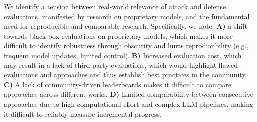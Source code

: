 




We identify a tension between real-world relevance of attack and defense evaluations, manifested by research on proprietary models, and the fundamental need for reproducible and comparable research. Specifically, we note: \textbf{A)} a shift towards black-box evaluations on proprietary models, which makes it more difficult to identify robustness through obscurity and hurts reproducibility (e.g., frequent model updates, limited control). \textbf{B)} Increased evaluation cost, which may result in a lack of third-party evaluations, which would highlight flawed evaluations and approaches and thus establish best practices in the community. \textbf{C)} A lack of community-driven leaderboards makes it difficult to compare approaches across different works. \textbf{D)} Limited comparability between consecutive approaches due to high computational effort and complex LLM pipelines, making it difficult to reliably measure incremental progress.

